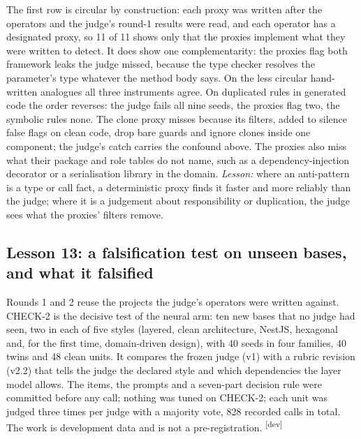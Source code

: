 \documentclass[10pt,a4paper]{article}
\newcommand{\devset}{\textsuperscript{\textsf{\tiny[dev]}}}
\begin{document}
The first row is circular by construction: each proxy was written after the operators and the judge's round-1
results were read, and each operator has a designated proxy, so 11 of 11 shows only that the proxies implement what
they were written to detect. It does show one complementarity: the proxies flag both framework leaks the judge missed,
because the type checker resolves the parameter's type whatever the method body says. %
On the less circular hand-written analogues all three instruments agree. On duplicated rules in generated code the
order reverses: the judge fails all nine seeds, the proxies flag two, the symbolic rules none. The clone proxy misses
because its filters, added to silence false flags on clean code, drop bare guards and ignore clones inside one
component; the judge's catch carries the confound above. %
The proxies also miss what their package and role tables do not name, such as a dependency-injection decorator or a
serialisation library in the domain. %
\emph{Lesson:} where an anti-pattern is a type or call fact, a deterministic proxy finds it faster and more reliably
than the judge; where it is a judgement about responsibility or duplication, the judge sees what the proxies'
filters remove.

\subsection{Lesson 13: a falsification test on unseen bases, and what it falsified}\label{sec:l13}

Rounds 1 and 2 reuse the projects the judge's operators were written against. CHECK-2 is the decisive test of the
neural arm: ten new bases that no judge had seen, two in each of five styles (layered, clean architecture, NestJS,
hexagonal and, for the first time, domain-driven design), with 40 seeds in four families, 40 twins and 48 clean units.
It compares the frozen judge (v1) with a rubric revision (v2.2) that tells the judge the declared style and which
dependencies the layer model allows. The items, the prompts and a seven-part decision rule were committed before any
call; nothing was tuned on CHECK-2; each unit was judged three times per judge with a majority vote, 828 recorded
calls in total. The work is development data and is not a pre-registration. \devset{}
\end{document}
